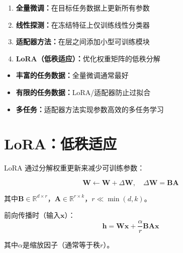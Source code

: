 \begin{enumerate}
    \item \textbf{全量微调：}在目标任务数据上更新所有参数
    \item \textbf{线性探测：}在冻结特征上仅训练线性分类器
    \item \textbf{适配器方法：}在层之间添加小型可训练模块
    \item \textbf{LoRA（低秩适应）：}优化权重矩阵的低秩分解
\end{enumerate}

\begin{note}[何时使用每种方法]
\begin{itemize}
    \item \textbf{丰富的任务数据：}全量微调通常最好
    \item \textbf{有限的任务数据：}LoRA/适配器防止过拟合
    \item \textbf{多任务：}适配器方法实现参数高效的多任务学习
\end{itemize}
\end{note}

\section{LoRA：低秩适应}

LoRA \cite{hu2021lora}通过分解权重更新来减少可训练参数：

\begin{equation}
\mathbf{W} \leftarrow \mathbf{W} + \Delta\mathbf{W}, \quad \Delta\mathbf{W} = \mathbf{B}\mathbf{A}
\end{equation}

其中$\mathbf{B} \in \mathbb{R}^{d \times r}$，$\mathbf{A} \in \mathbb{R}^{r \times k}$，$r \ll \min(d, k)$。

前向传播时（输入$\mathbf{x}$）：
\begin{equation}
\mathbf{h} = \mathbf{W}\mathbf{x} + \frac{\alpha}{r}\mathbf{B}\mathbf{A}\mathbf{x}
\end{equation}

其中$\alpha$是缩放因子（通常等于秩$r$）。

